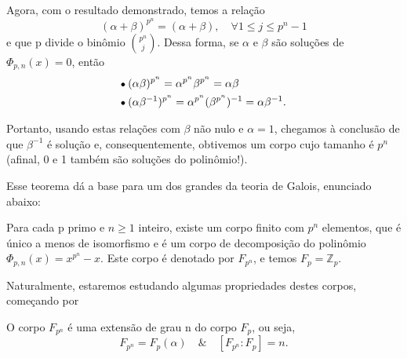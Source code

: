 \documentclass[../algebraIII_notes.tex]{subfiles}
\begin{document}
\begin{proof*}
	Agora, com o resultado demonstrado, temos a relação
	\[
		(\alpha +\beta )^{p^{n}} = (\alpha +\beta ), \quad \forall 1\leq j\leq p^{n}-1
	\]
	e que p divide o binômio \(\binom{p^{n}}{j}\).
	Dessa forma, se \(\alpha \) e \(\beta \) são soluções de \(\Phi_{p, n}(x)=0\), então
	\begin{align*}
		 & \tikz[baseline=-0.5ex]\draw[black, fill=black, radius=1.5pt](0, 0)circle;\; (\alpha \beta )^{p^{n}} = \alpha^{p^{n}}\beta^{p^{n}} = \alpha \beta               \\
		 & \tikz[baseline=-0.5ex]\draw[black, fill=black, radius=1.5pt](0, 0)circle;\; (\alpha\beta^{-1})^{p^{n}} = \alpha^{p^{n}}(\beta^{p^{n}})^{-1}=\alpha \beta^{-1}.
	\end{align*}

	Portanto, usando estas relações com \(\beta \) não nulo e \(\alpha =1\), chegamos à conclusão de que \(\beta^{-1}\) é solução e, consequentemente, obtivemos um corpo cujo tamanho é \(p^{n}\) (afinal, 0 e 1 também são soluções do polinômio!). \qedsymbol
\end{proof*}

Esse teorema dá a base para um dos grandes da teoria de Galois, enunciado abaixo:

\hypertarget{galois_moore}{
	\begin{theorem*}
		Para cada p primo e \(n\geq 1\) inteiro, existe um corpo finito com \(p^{n}\) elementos, que é único a menos de isomorfismo e é um corpo de decomposição do polinômio \(\Phi_{p, n}(x) = x^{p^{n}}-x\).
		Este corpo é denotado por \(F_{p^{n}}\), e temos \(F_{p} = \mathbb{Z}_{p}\).
	\end{theorem*}
}

Naturalmente, estaremos estudando algumas propriedades destes corpos, começando por
\begin{prop*}
	O corpo \(F_{p^{n}}\) é uma extensão de grau n do corpo \(F_{p}\), ou seja,
	\[
		F_{p^{n}} = F_{p}(\alpha ) \quad\&\quad [F_{p^{n}}:F_{p}] = n.
	\]
\end{prop*}
\end{document}
